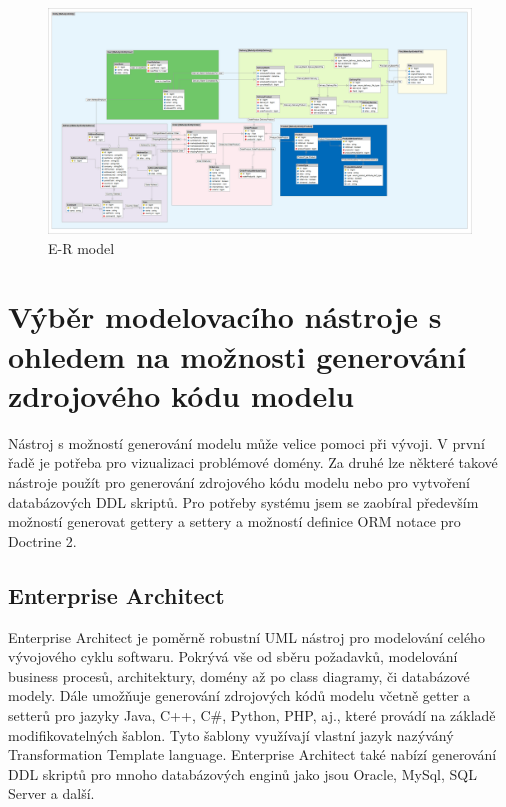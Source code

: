 \documentclass[thesis=B,czech]{FITthesis}[2012/06/26]
\begin{document}
\begin{figure}[H]
	\includegraphics[width=500pt, height=\textwidth, angle=90]{mahasys_ermodel.png}
	\caption{E-R model}\label{er_model}
\end{figure}

\section{Výběr modelovacího nástroje s ohledem na možnosti generování zdrojového kódu modelu}
	Nástroj s možností generování modelu může velice pomoci při vývoji. V první řadě je potřeba pro vizualizaci problémové domény. Za druhé lze některé takové nástroje použít pro generování zdrojového kódu modelu nebo pro vytvoření databázových DDL skriptů. Pro potřeby systému jsem se zaobíral především možností generovat gettery a settery a možností definice ORM notace pro Doctrine 2.

\subsection{Enterprise Architect}
	Enterprise Architect je poměrně robustní UML nástroj pro modelování celého vývojového cyklu softwaru. Pokrývá vše od sběru požadavků, modelování business procesů, architektury, domény až po class diagramy, či databázové modely. Dále umožňuje generování zdrojových kódů modelu včetně getter a setterů pro jazyky Java, C++, C\#, Python, PHP, aj., které provádí na základě modifikovatelných šablon. Tyto šablony využívají vlastní jazyk nazýváný Transformation Template language. Enterprise Architect také nabízí generování DDL skriptů pro mnoho databázových enginů jako jsou Oracle, MySql, SQL Server a další.
\end{document}
